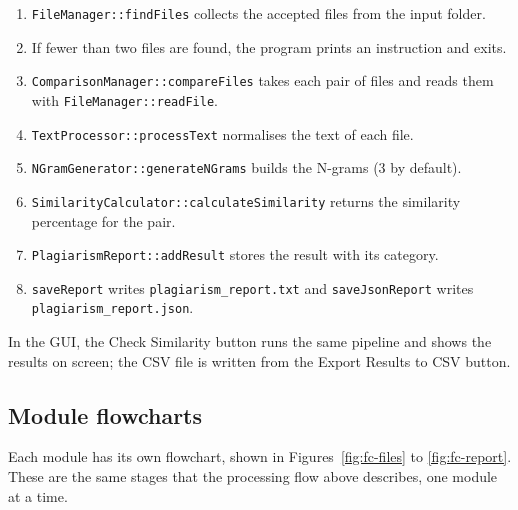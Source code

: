 \documentclass[11pt,a4paper]{report}
\newcommand{\cc}[1]{\texttt{#1}}
\begin{document}
\begin{enumerate}[nosep]
  \item \cc{FileManager::findFiles} collects the accepted files from the input folder.
  \item If fewer than two files are found, the program prints an instruction and exits.
  \item \cc{ComparisonManager::compareFiles} takes each pair of files and reads them with
        \cc{FileManager::readFile}.
  \item \cc{TextProcessor::processText} normalises the text of each file.
  \item \cc{NGramGenerator::generateNGrams} builds the N-grams (3 by default).
  \item \cc{SimilarityCalculator::calculateSimilarity} returns the similarity percentage
        for the pair.
  \item \cc{PlagiarismReport::addResult} stores the result with its category.
  \item \cc{saveReport} writes \cc{plagiarism\_report.txt} and \cc{saveJsonReport} writes
        \cc{plagiarism\_report.json}.
\end{enumerate}
In the GUI, the Check Similarity button runs the same pipeline and shows the results on
screen; the CSV file is written from the Export Results to CSV button.

\subsection{Module flowcharts}
Each module has its own flowchart, shown in Figures~\ref{fig:fc-files} to
\ref{fig:fc-report}. These are the same stages that the processing flow above describes,
one module at a time.
\end{document}

